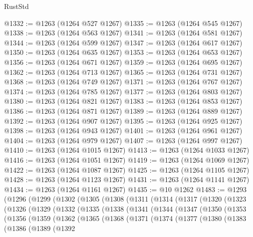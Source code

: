\begin{lexlean}{RustStd}
\begin{coremodule}
@1332 := @1263 (@1264 @527 @1267)
@1335 := @1263 (@1264 @545 @1267)
@1338 := @1263 (@1264 @563 @1267)
@1341 := @1263 (@1264 @581 @1267)
@1344 := @1263 (@1264 @599 @1267)
@1347 := @1263 (@1264 @617 @1267)
@1350 := @1263 (@1264 @635 @1267)
@1353 := @1263 (@1264 @653 @1267)
@1356 := @1263 (@1264 @671 @1267)
@1359 := @1263 (@1264 @695 @1267)
@1362 := @1263 (@1264 @713 @1267)
@1365 := @1263 (@1264 @731 @1267)
@1368 := @1263 (@1264 @749 @1267)
@1371 := @1263 (@1264 @767 @1267)
@1374 := @1263 (@1264 @785 @1267)
@1377 := @1263 (@1264 @803 @1267)
@1380 := @1263 (@1264 @821 @1267)
@1383 := @1263 (@1264 @853 @1267)
@1386 := @1263 (@1264 @871 @1267)
@1389 := @1263 (@1264 @889 @1267)
@1392 := @1263 (@1264 @907 @1267)
@1395 := @1263 (@1264 @925 @1267)
@1398 := @1263 (@1264 @943 @1267)
@1401 := @1263 (@1264 @961 @1267)
@1404 := @1263 (@1264 @979 @1267)
@1407 := @1263 (@1264 @997 @1267)
@1410 := @1263 (@1264 @1015 @1267)
@1413 := @1263 (@1264 @1033 @1267)
@1416 := @1263 (@1264 @1051 @1267)
@1419 := @1263 (@1264 @1069 @1267)
@1422 := @1263 (@1264 @1087 @1267)
@1425 := @1263 (@1264 @1105 @1267)
@1428 := @1263 (@1264 @1123 @1267)
@1431 := @1263 (@1264 @1141 @1267)
@1434 := @1263 (@1264 @1161 @1267)
@1435 := @10 @1262
@1483 := @1293
    (@1296
      (@1299
        (@1302
          (@1305
            (@1308
              (@1311
                (@1314
                  (@1317
                    (@1320
                      (@1323
                        (@1326
                          (@1329
                            (@1332
                              (@1335
                                (@1338
                                  (@1341
                                    (@1344
                                      (@1347
                                        (@1350
                                          (@1353
                                            (@1356
                                              (@1359
                                                (@1362
                                                  (@1365
                                                    (@1368
                                                      (@1371
                                                        (@1374
                                                          (@1377
                                                            (@1380
                                                              (@1383
                                                                (@1386
                                                                  (@1389
                                                                    (@1392

\end{coremodule}
\end{lexlean}

